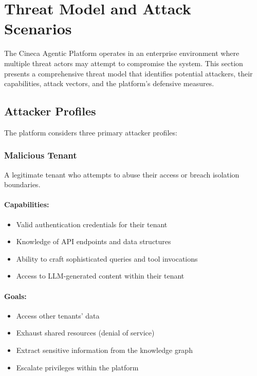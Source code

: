 
\section{Threat Model and Attack Scenarios}
\label{sec:threat-model}

The Cineca Agentic Platform operates in an enterprise environment where multiple threat actors may attempt to compromise the system. This section presents a comprehensive threat model that identifies potential attackers, their capabilities, attack vectors, and the platform's defensive measures.

\subsection{Attacker Profiles}
\label{subsec:attacker-profiles}

The platform considers three primary attacker profiles:

\subsubsection{Malicious Tenant}

A legitimate tenant who attempts to abuse their access or breach isolation boundaries.

\paragraph{Capabilities:}
\begin{itemize}
    \item Valid authentication credentials for their tenant
    \item Knowledge of API endpoints and data structures
    \item Ability to craft sophisticated queries and tool invocations
    \item Access to LLM-generated content within their tenant
\end{itemize}

\paragraph{Goals:}
\begin{itemize}
    \item Access other tenants' data
    \item Exhaust shared resources (denial of service)
    \item Extract sensitive information from the knowledge graph
    \item Escalate privileges within the platform
\end{itemize}

